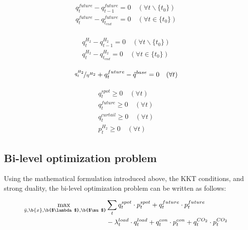 \documentclass[review]{elsarticle}
\begin{document}
\begin{align}\label{L3}
\begin{aligned}
q_{t}^{future} - q_{t-1}^{future} = 0 \quad (\forall t \backslash \{t_0\})\\
q_{t}^{future} - q_{t_{end}}^{future} = 0 \quad (\forall t \in \{t_0\})
\end{aligned}
\end{align}

\begin{align}\label{L5}
\begin{aligned}
q_{t}^{H_2} - q_{t-1}^{H_2} = 0 \quad (\forall t \backslash \{t_0\})\\
q_{t}^{H_2} - q_{t_{end}}^{H_2} = 0 \quad (\forall t \in \{t_0\})
\end{aligned}
\end{align}

\begin{align}\label{L7}
\nicefrac{q_{t}^{H_2}}{\eta^{H_2}} + q_{t}^{future} - \tilde{q}^{base} = 0 \quad (\forall t)
\end{align}

\begin{align}\label{L8}
\begin{aligned}
q_{t}^{spot} \geq 0 \quad (\forall t)\\
q_{t}^{future} \geq 0 \quad (\forall t)\\
q_{t}^{curtail} \geq 0 \quad (\forall t)\\
p_{t}^{H_2} \geq 0 \quad (\forall t)
\end{aligned}
\end{align}

\subsection{Bi-level optimization problem}\label{sec:bi_level}
Using the mathematical formulation introduced above, the KKT conditions, and strong duality, the bi-level optimization problem can be written as follows:

\begin{align}\label{bi_1}
\begin{split}
\underset{\bar{y}, \b{x}, \b{$\lambda$}, \b{$\mu$}}{\mathrm{max~}}&\sum_{t} q_{t}^{spot}\cdot p_{t}^{spot}+q_{t}^{future}\cdot p_{t}^{future}\\
& - \lambda_{t}^{load} \cdot q_{t}^{load} + q_{t}^{con}\cdot p_{t}^{con}+q_{t}^{CO_2}\cdot p_{t}^{CO_2}\\
\end{split}
\end{align}
\end{document}
